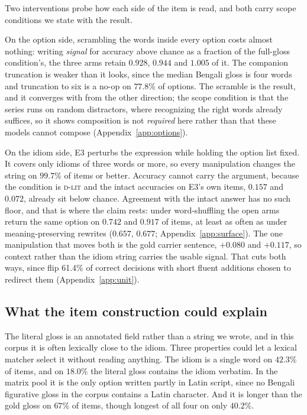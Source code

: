 \documentclass[11pt]{article}
\newcommand{\Dlit}{\textsc{d-lit}}
\begin{document}
Two interventions probe how each side of the item is read, and both carry scope
conditions we state with the result.

On the option side, scrambling the words inside every option costs almost nothing:
writing \emph{signal} for accuracy above chance as a fraction of the full-gloss
condition's, the three arms retain $0.928$, $0.944$ and $1.005$ of it. The
companion truncation is weaker than it looks, since the median Bengali gloss is
four words and truncation to six is a no-op on $77.8\%$ of options. The scramble
is the result, and it converges with \citet{sun2026typesafe} from the other
direction; the scope condition is that the series runs on random distractors,
where recognizing the right words already suffices, so it shows composition is not
\emph{required} here rather than that these models cannot compose
(Appendix~\ref{app:options}).

On the idiom side, E3 perturbs the expression while holding the option list fixed.
It covers only idioms of three words or more, so every manipulation changes the
string on $99.7\%$ of items or better. Accuracy cannot carry the argument, because
the condition is \Dlit{} and the intact accuracies on E3's own items, $0.157$ and
$0.072$, already sit below chance. Agreement with the intact answer has no such
floor, and that is where the claim rests: under word-shuffling the open arms
return the same option on $0.742$ and $0.917$ of items, at least as often as under
meaning-preserving rewrites ($0.657$, $0.677$; Appendix~\ref{app:surface}). The one manipulation that moves both is the gold
carrier sentence, $+0.080$ and $+0.117$, so context rather than the idiom string
carries the usable signal. That cuts both ways, since \citet{xu2026jevout} flip
61.4\% of correct decisions with short fluent additions chosen to redirect them
(Appendix~\ref{app:unit}).

\subsection{What the item construction could explain}
\label{sec:construction}

The literal gloss is an annotated field rather than a string we wrote, and in this
corpus it is often lexically close to the idiom. Three properties could let a
lexical matcher select it without reading anything. The idiom is a single word on
$42.3\%$ of items, and on $18.0\%$ the literal gloss contains the idiom verbatim.
In the matrix pool it is the only option written partly in Latin script, since no
Bengali figurative gloss in the corpus contains a Latin character. And it is longer
than the gold gloss on $67\%$ of items, though longest of all four on only
$40.2\%$.
\end{document}
